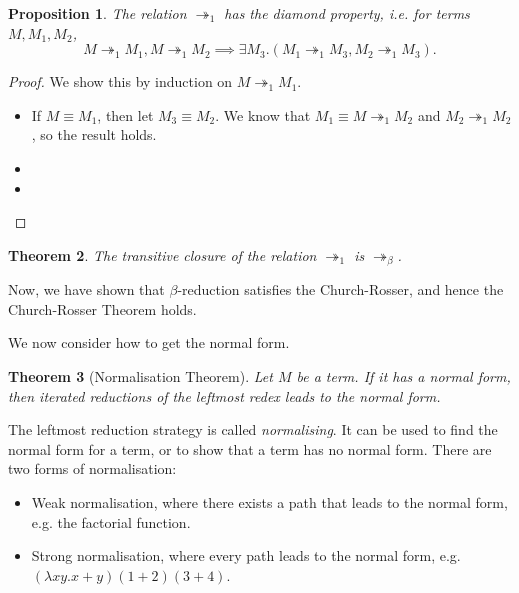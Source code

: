 \documentclass[a4paper, openany]{memoir}
\newtheorem{proposition}{Proposition}[section]
\newtheorem{theorem}[proposition]{Theorem}
\theoremstyle{definition}
\begin{document}
    \begin{proposition}
        The relation $\twoheadrightarrow_1$ has the diamond property, i.e. for terms $M, M_1, M_2$,
        \[M \twoheadrightarrow_1 M_1, M \twoheadrightarrow_1 M_2 \implies \exists M_3 . (M_1 \twoheadrightarrow_ 1 M_3, M_2 \twoheadrightarrow_1 M_3).\]
    \end{proposition}
    \begin{proof}
        We show this by induction on $M \twoheadrightarrow_1 M_1$.
        \begin{itemize}
            \item If $M \equiv M_1$, then let $M_3 \equiv M_2$. We know that $M_1 \equiv M \twoheadrightarrow_1 M_2$ and $M_2 \twoheadrightarrow_1 M_2$, so the result holds.
            
            \item 
            \item 
        \end{itemize}
    \end{proof}

    \begin{theorem}
        The transitive closure of the relation $\twoheadrightarrow_1$ is $\twoheadrightarrow_\beta$.
    \end{theorem}
    \noindent Now, we have shown that $\beta$-reduction satisfies the Church-Rosser, and hence the Church-Rosser Theorem holds.

    We now consider how to get the normal form.    
    \begin{theorem}[Normalisation Theorem]
        Let $M$ be a term. If it has a normal form, then iterated reductions of the leftmost redex leads to the normal form.
    \end{theorem}
    \noindent The leftmost reduction strategy is called \emph{normalising}. It can be used to find the normal form for a term, or to show that a term has no normal form. There are two forms of normalisation:
    \begin{itemize}
        \item Weak normalisation, where there exists a path that leads to the normal form, e.g. the factorial function.
        \item Strong normalisation, where every path leads to the normal form, e.g. $(\lambda xy. x + y)(1 + 2)(3 + 4)$.
    \end{itemize}
\end{document}
